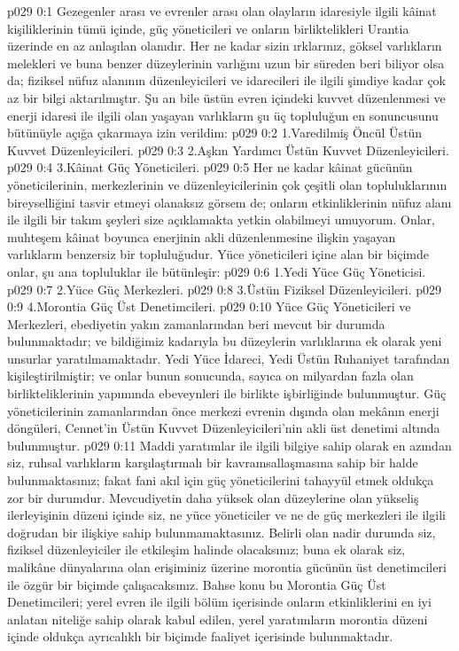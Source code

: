\vs p029 0:1 Gezegenler arası ve evrenler arası olan olayların idaresiyle ilgili kâinat kişiliklerinin tümü içinde, güç yöneticileri ve onların birliktelikleri Urantia üzerinde en az anlaşılan olanıdır. Her ne kadar sizin ırklarınız, göksel varlıkların melekleri ve buna benzer düzeylerinin varlığını uzun bir süreden beri biliyor olsa da; fiziksel nüfuz alanının düzenleyicileri ve idarecileri ile ilgili şimdiye kadar çok az bir bilgi aktarılmıştır. Şu an bile üstün evren içindeki kuvvet düzenlenmesi ve enerji idaresi ile ilgili olan yaşayan varlıkların şu üç topluluğun en sonuncusunu bütünüyle açığa çıkarmaya izin verildim:
\vs p029 0:2 1.\bibnobreakspace Varedilmiş Öncül Üstün Kuvvet Düzenleyicileri.
\vs p029 0:3 2.\bibnobreakspace Aşkın Yardımcı Üstün Kuvvet Düzenleyicileri.
\vs p029 0:4 3.\bibnobreakspace Kâinat Güç Yöneticileri.
\vs p029 0:5 Her ne kadar kâinat gücünün yöneticilerinin, merkezlerinin ve düzenleyicilerinin çok çeşitli olan topluluklarının bireyselliğini tasvir etmeyi olanaksız görsem de; onların etkinliklerinin nüfuz alanı ile ilgili bir takım şeyleri size açıklamakta yetkin olabilmeyi umuyorum. Onlar, muhteşem kâinat boyunca enerjinin akli düzenlenmesine ilişkin yaşayan varlıkların benzersiz bir topluluğudur. Yüce yöneticileri içine alan bir biçimde onlar, şu ana topluluklar ile bütünleşir:
\vs p029 0:6 1.\bibnobreakspace Yedi Yüce Güç Yöneticisi.
\vs p029 0:7 2.\bibnobreakspace Yüce Güç Merkezleri.
\vs p029 0:8 3.\bibnobreakspace Üstün Fiziksel Düzenleyicileri.
\vs p029 0:9 4.\bibnobreakspace Morontia Güç Üst Denetimcileri.
\vs p029 0:10 Yüce Güç Yöneticileri ve Merkezleri, ebediyetin yakın zamanlarından beri mevcut bir durumda bulunmaktadır; ve bildiğimiz kadarıyla bu düzeylerin varlıklarına ek olarak yeni unsurlar yaratılmamaktadır. Yedi Yüce İdareci, Yedi Üstün Ruhaniyet tarafından kişileştirilmiştir; ve onlar bunun sonucunda, sayıca on milyardan fazla olan birlikteliklerinin yapımında ebeveynleri ile birlikte işbirliğinde bulunmuştur. Güç yöneticilerinin zamanlarından önce merkezi evrenin dışında olan mekânın enerji döngüleri, Cennet’in Üstün Kuvvet Düzenleyicileri’nin akli üst denetimi altında bulunmuştur.
\vs p029 0:11 Maddi yaratımlar ile ilgili bilgiye sahip olarak en azından siz, ruhsal varlıkların karşılaştırmalı bir kavramsallaşmasına sahip bir halde bulunmaktasınız; fakat fani akıl için güç yöneticilerini tahayyül etmek oldukça zor bir durumdur. Mevcudiyetin daha yüksek olan düzeylerine olan yükseliş ilerleyişinin düzeni içinde siz, ne yüce yöneticiler ve ne de güç merkezleri ile ilgili doğrudan bir ilişkiye sahip bulunmamaktasınız. Belirli olan nadir durumda siz, fiziksel düzenleyiciler ile etkileşim halinde olacaksınız; buna ek olarak siz, malikâne dünyalarına olan erişiminiz üzerine morontia gücünün üst denetimcileri ile özgür bir biçimde çalışacaksınız. Bahse konu bu Morontia Güç Üst Denetimcileri; yerel evren ile ilgili bölüm içerisinde onların etkinliklerini en iyi anlatan niteliğe sahip olarak kabul edilen, yerel yaratımların morontia düzeni içinde oldukça ayrıcalıklı bir biçimde faaliyet içerisinde bulunmaktadır.
